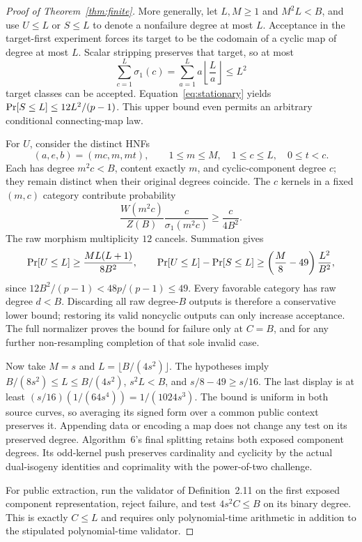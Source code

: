 \documentclass[11pt]{article}
\newcommand{\Prob}{\mathop{\rm Pr}}
\begin{document}
\begin{proof}[Proof of Theorem~\ref{thm:finite}]
More generally, let $L,M\ge1$ and $M^2L<B$, and use $U\le L$ or $S\le L$
to denote a nonfailure degree at most $L$. Acceptance in the target-first
experiment forces its target to be the codomain of a cyclic map of degree at most
$L$. Scalar stripping preserves that target, so at most
\[
 \sum_{c=1}^L\sigma_1(c)=\sum_{a=1}^L a\left\lfloor\frac La\right\rfloor\le L^2
\]
target classes can be accepted. Equation~\eqref{eq:stationary} yields
$\Prob[S\le L]\le12L^2/(p-1)$.
This upper bound even permits an arbitrary conditional connecting-map law.

For $U$, consider the distinct HNFs
\[
 (a,e,b)=(mc,m,mt),\qquad
 1\le m\le M,\quad1\le c\le L,\quad0\le t<c.
\]
Each has degree $m^2c<B$, content exactly $m$, and cyclic-component degree $c$;
they remain distinct when their original degrees coincide. The $c$ kernels in a
fixed $(m,c)$ category contribute probability
\[
 \frac{W(m^2c)}{Z(B)}\frac{c}{\sigma_1(m^2c)}
 \ge\frac{c}{4B^2}.
\]
The raw morphism multiplicity $12$ cancels. Summation gives
\[
 \Prob[U\le L]\ge\frac{ML(L+1)}{8B^2},\qquad
 \Prob[U\le L]-\Prob[S\le L]
 \ge\left(\frac M8-49\right)\frac{L^2}{B^2},
\]
since $12B^2/(p-1)<48p/(p-1)\le49$. Every favorable category has raw degree
$d<B$. Discarding all raw degree-$B$ outputs is therefore a conservative lower
bound; restoring its valid noncyclic outputs can only increase acceptance.
The full normalizer proves the bound for failure only at $C=B$, and for any
further non-resampling completion of that sole invalid case.

Now take $M=s$ and $L=\lfloor B/(4s^2)\rfloor$. The hypotheses imply
$B/(8s^2)\le L\le B/(4s^2)$, $s^2L<B$, and $s/8-49\ge s/16$.
The last display is at least
$(s/16)(1/(64s^4))=1/(1024s^3)$.
The bound is uniform in both source curves, so averaging its signed form over a
common public context preserves it. Appending data or encoding a map does not
change any test on its preserved degree. Algorithm~6's final splitting retains
both exposed component degrees. Its odd-kernel push preserves cardinality and
cyclicity by the actual dual-isogeny identities and coprimality with the
power-of-two challenge.

For public extraction, run the validator of Definition~2.11 on the first exposed
component representation, reject failure, and test $4s^2C\le B$ on its binary
degree. This is exactly $C\le L$ and requires only polynomial-time arithmetic
in addition to the stipulated polynomial-time validator.
\end{proof}
\end{document}
